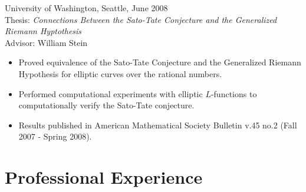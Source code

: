 \documentclass{article}
\begin{document}
\begin{itemize}
    University of Washington, Seattle, June 2008 \\ Thesis: {\it
      Connections Between the Sato-Tate Conjecture and the Generalized
      Riemann Hyptothesis} \\ Advisor: William Stein
   \begin{itemize}
   \item Proved equivalence of the Sato-Tate Conjecture and the Generalized
     Riemann Hypothesis for elliptic curves over the rational numbers.
   \item Performed computational experiments with elliptic $L$-functions to
     computationally verify the Sato-Tate conjecture.
   \item Results published in American Mathematical Society Bulletin v.45 no.2
     (Fall 2007 - Spring 2008).
   \end{itemize}
\end{itemize}


\section*{Professional Experience}
\end{document}
